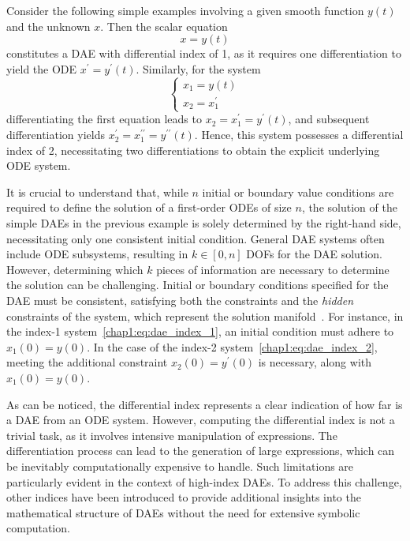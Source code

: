 \begin{example}
  Consider the following simple examples involving a given smooth function $y(t)$ and the unknown $x$. Then the scalar equation
  \begin{equation}
    x = y(t)
    \label{chap1:eq:dae_index_1}
  \end{equation}
  constitutes a \ac{DAE} with differential index of 1, as it requires one differentiation to yield the \ac{ODE} $x^{\prime} = y^{\prime}(t)$. Similarly, for the system
  \begin{equation}
    \begin{cases}
      x_1 = y(t) \\
      x_2 = x_1^{\prime}
    \end{cases}
    \label{chap1:eq:dae_index_2}
  \end{equation}
  differentiating the first equation leads to $x_2 = x_1^{\prime} = y^{\prime}(t)$, and subsequent differentiation yields $x_2^{\prime} = x_1^{\prime\prime} = y^{\prime\prime}(t)$. Hence, this system possesses a differential index of 2, necessitating two differentiations to obtain the explicit underlying \ac{ODE} system.
\end{example}

It is crucial to understand that, while $n$ initial or boundary value conditions are required to define the solution of a first-order \acp{ODE} of size $n$, the solution of the simple \acp{DAE} in the previous example is solely determined by the right-hand side, necessitating only one consistent initial condition. General \ac{DAE} systems often include \ac{ODE} subsystems, resulting in $k \in [0, n]$ \acp{DOF} for the \ac{DAE} solution. However, determining which $k$ pieces of information are necessary to determine the solution can be challenging. Initial or boundary conditions specified for the \ac{DAE} must be consistent, satisfying both the constraints and the \emph{hidden} constraints of the system, which represent the solution manifold~\cite{rheinboldt1984differential}. For instance, in the index-1 system~\eqref{chap1:eq:dae_index_1}, an initial condition must adhere to $x_1(0) = y(0)$. In the case of the index-2 system~\eqref{chap1:eq:dae_index_2}, meeting the additional constraint $x_2(0) = y^{\prime}(0)$ is necessary, along with $x_1(0) = y(0)$.

As can be noticed, the differential index represents a clear indication of how far is a \ac{DAE} from an \ac{ODE} system. However, computing the differential index is not a trivial task, as it involves intensive manipulation of expressions. The differentiation process can lead to the generation of large expressions, which can be inevitably computationally expensive to handle. Such limitations are particularly evident in the context of high-index \acp{DAE}. To address this challenge, other indices have been introduced to provide additional insights into the mathematical structure of \acp{DAE} without the need for extensive symbolic computation.

